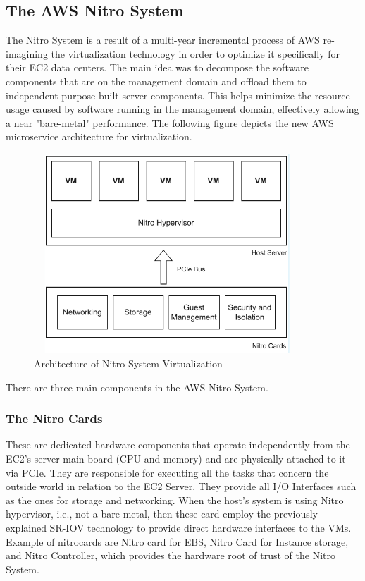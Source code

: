 \subsection{The AWS Nitro System}
The Nitro System is a result of a multi-year incremental process of AWS re-imagining the virtualization 
technology in order to optimize it specifically for their EC2 data centers. The main idea was to decompose 
the software components that are on the management domain and offload them to independent purpose-built server 
components. This helps minimize the resource usage caused by software running in the management domain, 
effectively allowing a near "bare-metal" performance. The following figure depicts the new AWS microservice 
architecture for virtualization. 
\begin{figure}[H]
  \centering
  \includegraphics[width=10cm, height=7.5cm]{figures/nitro.pdf}
  \caption{Architecture of Nitro System Virtualization}
  \label{fig:nitro}
\end{figure}
\noindent
There are three main components in the AWS Nitro System. 
\subsubsection{The Nitro Cards}
These are dedicated hardware components that operate independently from the EC2's server main board 
(CPU and memory) and are physically attached to it via PCIe. They are responsible for executing all the 
tasks that concern the outside world in relation to the EC2 Server. They provide all I/O Interfaces such 
as the ones for storage and networking. When the host's system is using Nitro hypervisor, i.e., not a 
bare-metal, then these card employ the previously explained SR-IOV technology to provide direct hardware 
interfaces to the VMs. Example of nitrocards are Nitro card for EBS, Nitro Card for Instance storage, and 
Nitro Controller, which provides the hardware root of trust of the Nitro System. 
